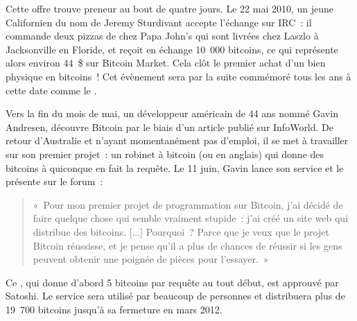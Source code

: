 Cette offre trouve preneur au bout de quatre jours. Le 22 mai 2010, un jeune Californien du nom de Jeremy Sturdivant accepte l'échange sur IRC~: il commande deux pizzas de chez Papa John's qui sont livrées chez Laszlo à Jacksonville en Floride, et reçoit en échange 10~000 bitcoins, ce qui représente alors environ 44~\$ sur Bitcoin Market. Cela clôt le premier achat d'un bien physique en bitcoins~! Cet évènement sera par la suite commémoré tous les ans à cette date comme le .


Vers la fin du mois de mai, un développeur américain de 44 ans nommé Gavin Andresen, découvre Bitcoin par le biais d'un article publié sur InfoWorld. De retour d'Australie et n'ayant momentanément pas d'emploi, il se met à travailler sur son premier projet~: un robinet à bitcoin (ou  en anglais) qui donne des bitcoins à quiconque en fait la requête. Le 11 juin, Gavin lance son service et le présente sur le forum~:

\begin{quote}
«~Pour mon premier projet de programmation sur Bitcoin, j'ai décidé de faire quelque chose qui semble vraiment stupide~: j'ai créé un site web qui distribue des bitcoins. [...] Pourquoi~? Parce que je veux que le projet Bitcoin réussisse, et je pense qu'il a plus de chances de réussir si les gens peuvent obtenir une poignée de pièces pour l'essayer.~»
\end{quote}

Ce , qui donne d'abord 5 bitcoins par requête au tout début, est approuvé par Satoshi. Le service sera utilisé par beaucoup de personnes et distribuera plus de 19~700 bitcoins jusqu'à sa fermeture en mars 2012.

